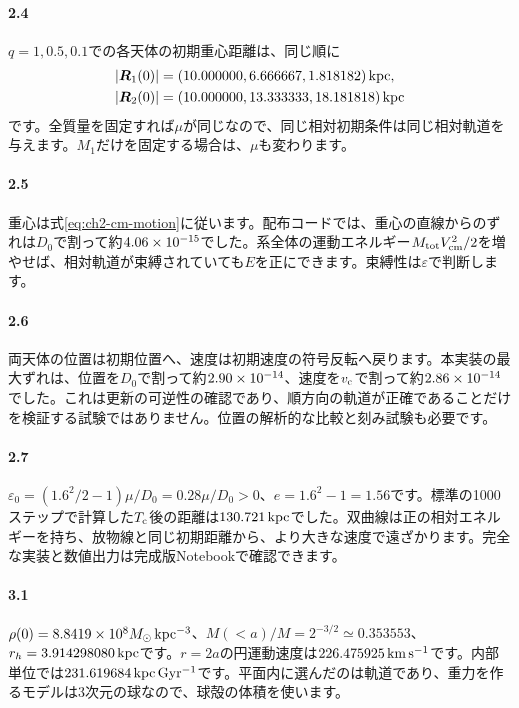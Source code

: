 \paragraph{2.4}
$q=1,0.5,0.1$での各天体の初期重心距離は、同じ順に
\[
\begin{aligned}
|\boldsymbol R_1(0)|&=(10.000000,6.666667,1.818182)\,\mathrm{kpc},\\
|\boldsymbol R_2(0)|&=(10.000000,13.333333,18.181818)\,\mathrm{kpc}
\end{aligned}
\]
です。全質量を固定すれば$\mu$が同じなので、同じ相対初期条件は同じ相対軌道を与えます。$M_1$だけを固定する場合は、$\mu$も変わります。

\paragraph{2.5}
重心は式\eqref{eq:ch2-cm-motion}に従います。配布コードでは、重心の直線からのずれは$D_0$で割って約$4.06\times 10^{-15}$でした。系全体の運動エネルギー$M_{\rm tot} V_{\rm cm}^2/2$を増やせば、相対軌道が束縛されていても$E$を正にできます。束縛性は$\varepsilon$で判断します。

\paragraph{2.6}
両天体の位置は初期位置へ、速度は初期速度の符号反転へ戻ります。本実装の最大ずれは、位置を$D_0$で割って約$2.90\times 10^{-14}$、速度を$v_{\rm c}$で割って約$2.86\times 10^{-14}$でした。これは更新の可逆性の確認であり、順方向の軌道が正確であることだけを検証する試験ではありません。位置の解析的な比較と刻み試験も必要です。

\paragraph{2.7}
$\varepsilon_0=(1.6^2/2-1)\mu/D_0=0.28\mu/D_0>0$、$e=1.6^2-1=1.56$です。標準の1000ステップで計算した$T_{\rm c}$後の距離は$130.721\,\mathrm{kpc}$でした。双曲線は正の相対エネルギーを持ち、放物線と同じ初期距離から、より大きな速度で遠ざかります。完全な実装と数値出力は完成版Notebookで確認できます。



\paragraph{3.1}
$\rho(0)=8.8419\times 10^{8}M_\odot\,\mathrm{kpc^{-3}}$、$M(<a)/M=2^{-3/2}\simeq0.353553$、$r_h=3.914298080\,\mathrm{kpc}$です。$r=2a$の円運動速度は$226.475925\,\mathrm{km\,s^{-1}}$です。内部単位では$231.619684\,\mathrm{kpc\,Gyr^{-1}}$です。平面内に選んだのは軌道であり、重力を作るモデルは3次元の球なので、球殻の体積を使います。

